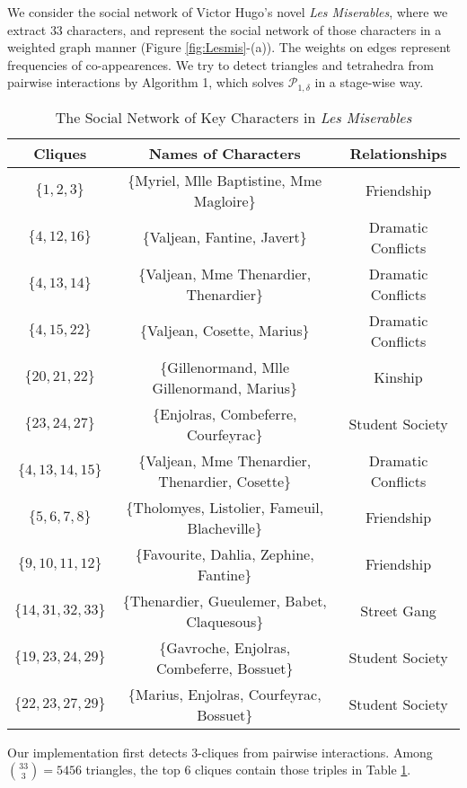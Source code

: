 \documentclass{article}
\begin{document}
We consider the social network \cite{Knuth93} of Victor Hugo's novel {\sl Les Miserables}, where we extract $33$ characters,
and represent the social network of those characters in a weighted graph manner (Figure \ref{fig:Lesmis}-(a)). The weights on edges
represent frequencies of co-appearences. We try to detect triangles and tetrahedra from pairwise interactions by Algorithm 1, which solves $\mathcal{P}_{1,\delta}$ in a stage-wise way. 
\begin{table}[ht]
\caption{\label{table:lesmistable}The Social Network of Key Characters in {\sl Les Miserables}}   
\centering                          
\begin{tabular}{c|c|c}            
\hline\hline                        
Cliques & Names of Characters & Relationships \\ [0.5ex]   %
\hline                              
$\{1,2,3\}$ & \{Myriel, Mlle Baptistine, Mme Magloire\} & Friendship\\
$\{4,12,16\}$ & \{Valjean, Fantine, Javert\} & Dramatic Conflicts\\
$\{4,13,14\}$ & \{Valjean, Mme Thenardier, Thenardier\} & Dramatic Conflicts \\
$\{4,15,22\}$ & \{Valjean, Cosette, Marius\} & Dramatic Conflicts\\
$\{20,21,22\}$ & \{Gillenormand, Mlle Gillenormand, Marius\} & Kinship\\
$\{23,24,27\}$ & \{Enjolras, Combeferre, Courfeyrac\} & Student Society \\\hline\hline
$\{4,13,14,15\}$ & \{Valjean, Mme Thenardier, Thenardier, Cosette\} & Dramatic Conflicts\\
$\{5,6,7,8\}$ & \{Tholomyes, Listolier, Fameuil, Blacheville\} & Friendship \\          
$\{9,10,11,12\}$ & \{Favourite, Dahlia, Zephine, Fantine\}  & Friendship \\
$\{14,31,32,33\}$ & \{Thenardier, Gueulemer, Babet, Claquesous\} & Street Gang \\
$\{19,23,24,29\}$ & \{Gavroche, Enjolras, Combeferre, Bossuet\} & Student Society\\
$\{22,23,27,29\}$ & \{Marius, Enjolras, Courfeyrac, Bossuet\} & Student Society\\
\hline                              
\end{tabular}
\end{table}
Our implementation first detects $3$-cliques from pairwise interactions. Among ${33\choose 3}=5456$ triangles, the top $6$ cliques contain those triples in Table \ref{table:lesmistable}. 
\end{document}
